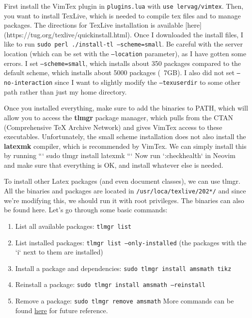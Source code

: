 \documentclass{article}
\begin{document}
  First install the VimTex plugin in \texttt{plugins.lua} with \texttt{use lervag/vimtex}. Then, you want to install TexLive, which is needed to compile tex files and to manage packages. The directions for TexLive installation is available [here](https://tug.org/texlive/quickinstall.html). Once I downloaded the install files, I like to run \texttt{sudo perl ./install-tl --scheme=small}. Be careful with the server location (which can be set with the \texttt{--location} parameter), as I have gotten some errors. I set \texttt{--scheme=small}, which installs about 350 packages compared to the default scheme, which installs about 5000 packages (~7GB). I also did not set \texttt{--no-interaction} since I want to slightly modify the \texttt{--texuserdir} to some other path rather than just my home directory. 

  Once you installed everything, make sure to add the binaries to PATH, which will allow you to access the \textbf{tlmgr} package manager, which pulls from the CTAN (Comprehensive TeX Archive Network) and gives VimTex access to these executables. Unfortunately, the small scheme installation does not also install the \textbf{latexmk} compiler, which is recommended by VimTex. We can simply install this by running 
  ```
  sudo tlmgr install latexmk
  ```
  Now run `:checkhealth` in Neovim and make sure that everything is OK, and install whatever else is needed. 


  To install other Latex packages (and even document classes), we can use tlmgr. All the binaries and packages are located in \texttt{/usr/loca/texlive/202*/} and since we're modifying this, we should run it with root privileges. The binaries can also be found here. Let's go through some basic commands: 
  \begin{enumerate}
    \item List all available packages: \texttt{tlmgr list}
    \item List installed packages: \texttt{tlmgr list --only-installed} (the packages with the `i` next to them are installed)
    \item Install a package and dependencies: \texttt{sudo tlmgr install amsmath tikz} 
    \item Reinstall a package: \texttt{sudo tlmgr install amsmath --reinstall}
    \item Remove a package: \texttt{sudo tlmgr remove amsmath} 
  More commands can be found \href{http://tug.ctan.org/info/tlmgrbasics/doc/tlmgr.pdf}{here} for future reference.  
  \end{enumerate}
\end{document}
